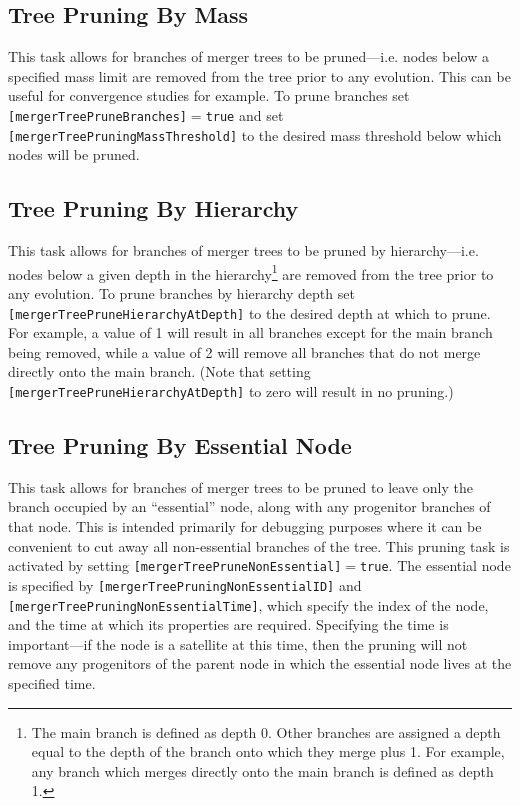 \subsection{Tree Pruning By Mass}

This task allows for branches of merger trees to be pruned---i.e. nodes below a specified mass limit are removed from the tree prior to any evolution. This can be useful for convergence studies for example. To prune branches set {\tt [mergerTreePruneBranches]}$=${\tt true} and set {\tt [mergerTreePruningMassThreshold]} to the desired mass threshold below which nodes will be pruned.

\subsection{Tree Pruning By Hierarchy}

This task allows for branches of merger trees to be pruned by hierarchy---i.e. nodes below a given depth in the hierarchy\footnote{The main branch is defined as depth 0. Other branches are assigned a depth equal to the depth of the branch onto which they merge plus 1. For example, any branch which merges directly onto the main branch is defined as depth 1.} are removed from the tree prior to any evolution.  To prune branches by hierarchy depth set {\tt [mergerTreePruneHierarchyAtDepth]} to the desired depth at which to prune. For example, a value of 1 will result in all branches except for the main branch being removed, while a value of 2 will remove all branches that do not merge directly onto the main branch. (Note that setting {\tt [mergerTreePruneHierarchyAtDepth]} to zero will result in no pruning.)

\subsection{Tree Pruning By Essential Node}

This task allows for branches of merger trees to be pruned to leave only the branch occupied by an ``essential'' node, along with any progenitor branches of that node. This is intended primarily for debugging purposes where it can be convenient to cut away all non-essential branches of the tree. This pruning task is activated by setting {\tt [mergerTreePruneNonEssential]}$=${\tt true}. The essential node is specified by {\tt [mergerTreePruningNonEssentialID]} and {\tt [mergerTreePruningNonEssentialTime]}, which specify the index of the node, and the time at which its properties are required. Specifying the time is important---if the node is a satellite at this time, then the pruning will not remove any progenitors of the parent node in which the essential node lives at the specified time.

